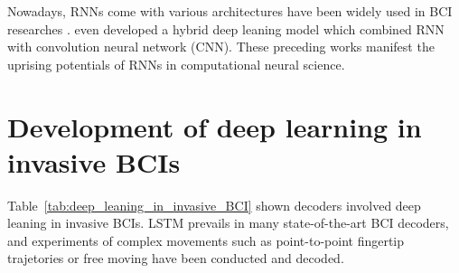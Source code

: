 Nowadays, RNNs come with various architectures have been widely used in BCI researches \citep{ahmadi2020impact}.
\cite{tuleuov2019deep} even developed a hybrid deep leaning model which combined RNN with convolution neural network (CNN). 
These preceding works manifest the uprising potentials of RNNs in computational neural science.

\section{Development of deep learning in invasive BCIs}
\label{sec:development_of_deep_learning_in_invasive_BCI}
Table~\ref{tab:deep_leaning_in_invasive_BCI} shown decoders involved deep leaning in invasive BCIs.
LSTM prevails in many state-of-the-art BCI decoders, and experiments of complex movements such as point-to-point fingertip trajetories or free moving have been conducted and decoded.



